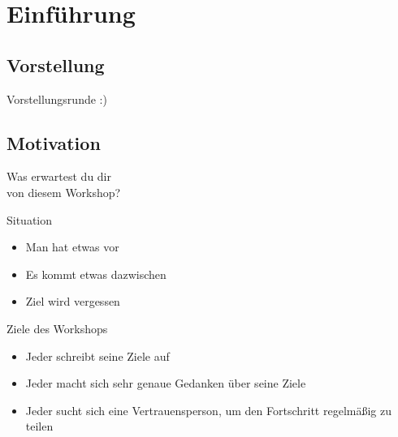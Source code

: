 \section{Einführung}

\subsection{Vorstellung}

\addtocounter{framenumber}{1}
\begin{frame}[standout]
    \LARGE
    Vorstellungsrunde :)
\end{frame}


\subsection{Motivation}


\addtocounter{framenumber}{1}
\begin{frame}[standout]
    \LARGE
    Was erwartest du dir \\
    von diesem Workshop?
\end{frame}


\begin{frame}[c]{Situation}
    \Large
    \begin{itemize}[<+(1)->]
        \item Man hat etwas vor
        \item Es kommt etwas dazwischen
        \item Ziel wird vergessen
    \end{itemize}
\end{frame}

\begin{frame}[c]{Ziele des Workshops}
    \Large
    \begin{itemize}[<+(1)->]
        \item Jeder schreibt seine Ziele auf
        \item Jeder macht sich sehr genaue Gedanken über seine Ziele
        \item Jeder sucht sich eine Vertrauensperson, um den Fortschritt regelmäßig zu teilen
    \end{itemize}
\end{frame}


